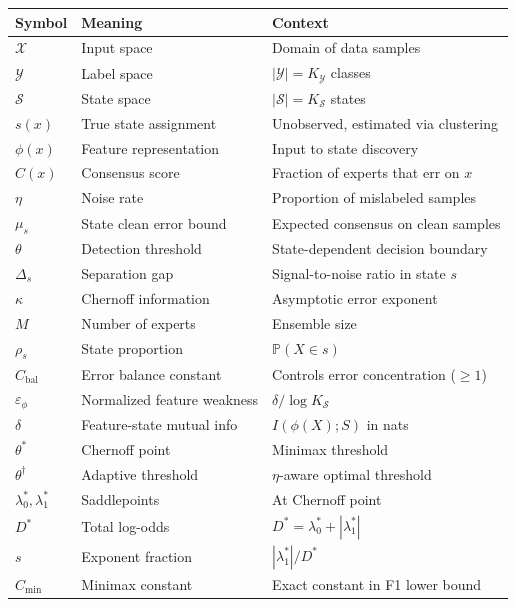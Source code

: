 \documentclass{article}
\begin{document}
\begin{longtable}{p{} p{} p{}}
\toprule
\textbf{Symbol} & \textbf{Meaning} & \textbf{Context} \\
\midrule
\endhead

\bottomrule
\endfoot

$\mathcal{X}$ & Input space & Domain of data samples \\
$\mathcal{Y}$ & Label space & $|\mathcal{Y}| = K_{\mathcal{Y}}$ classes \\
$\mathcal{S}$ & State space & $|\mathcal{S}| = K_{\mathcal{S}}$ states \\
$s(x)$ & True state assignment & Unobserved, estimated via clustering \\
$\phi(x)$ & Feature representation & Input to state discovery \\
$C(x)$ & Consensus score & Fraction of experts that err on $x$ \\
$\eta$ & Noise rate & Proportion of mislabeled samples \\
$\mu_s$ & State clean error bound & Expected consensus on clean samples \\
$\theta$ & Detection threshold & State-dependent decision boundary \\
$\Delta_s$ & Separation gap & Signal-to-noise ratio in state $s$ \\
$\kappa$ & Chernoff information & Asymptotic error exponent \\
$M$ & Number of experts & Ensemble size \\
$\rho_s$ & State proportion & $\mathbb{P}(X \in s)$ \\
$C_{\text{bal}}$ & Error balance constant & Controls error concentration ($\geq 1$) \\
$\varepsilon_\phi$ & Normalized feature weakness & $\delta / \log K_{\mathcal{S}}$ \\
$\delta$ & Feature-state mutual info & $I(\phi(X); S)$ in nats \\
$\theta^*$ & Chernoff point & Minimax threshold \\
$\theta^\dagger$ & Adaptive threshold & $\eta$-aware optimal threshold \\
$\lambda_0^*, \lambda_1^*$ & Saddlepoints & At Chernoff point \\
$D^*$ & Total log-odds & $D^* = \lambda_0^* + |\lambda_1^*|$ \\
$s$ & Exponent fraction & $|\lambda_1^*|/D^*$ \\
$C_{\min}$ & Minimax constant & Exact constant in F1 lower bound \\

\end{longtable}
\end{document}

